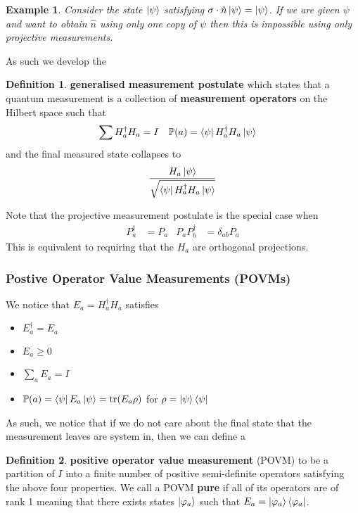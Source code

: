 \documentclass{article}
\newtheorem{example}{Example}
\theoremstyle{definition}
\newtheorem{definition}{Definition}
\begin{document}
\begin{example}
  Consider the state $\ket\psi$ satisfying $\sigma \cdot \hat{n} \ket\psi = 
  \ket \psi$. If we are given $\psi$ and want to obtain $\hat n$ using only
  one copy of $\psi$ then this is impossible using only projective 
  measurements.
\end{example}

As such we develop the

\begin{definition}
  \textbf{generalised measurement postulate} which states that a quantum 
  measurement is a collection of \textbf{measurement operators} on the Hilbert
  space such that
  \begin{align}
    \sum H_a^\dagger H_a &= I & \mathbb{P}(a) &= \bra \psi H_a^\dagger H_a \ket 
    \psi
  \end{align}
  and the final measured state collapses to
  \begin{equation}
    \frac{H_a \ket \psi}{\sqrt{\bra \psi H_a^\dagger H_a \ket \psi}}
  \end{equation}
\end{definition}

Note that the projective measurement postulate is the special case when
\begin{align}
  P_a^\dagger &= P_a & P_a P_b^\dagger &= \delta_{ab} P_a
\end{align}
This is equivalent to requiring that the $H_a$ are orthogonal projections.

\subsubsection{Postive Operator Value Measurements (POVMs)}

We notice that $E_a = H_a^\dagger H_a$ satisfies

\begin{itemize}
  \item $E_a^\dagger = E_a$
  \item $E_a \geq 0$
  \item $\sum_a E_a = I$
  \item $\mathbb{P}(a) = \bra\psi E_a \ket\psi = \tr(E_a \rho)$ for 
    $\rho = \ket \psi \bra \psi$
\end{itemize}

As such, we notice that if we do not care about the final state that the 
measurement leaves are system in, then we can define a
\begin{definition}
  \textbf{positive operator value measurement} (POVM) 
  to be a partition of $I$ into
  a finite number of positive semi-definite operators satisfying the above four
  properties. We call a POVM \textbf{pure} if all of its operators are of rank
  1 meaning that there exists states $\ket{\varphi_a}$ such that $E_a = 
  \ket{\varphi_a} \bra{\varphi_a}$.
\end{definition}
\end{document}
